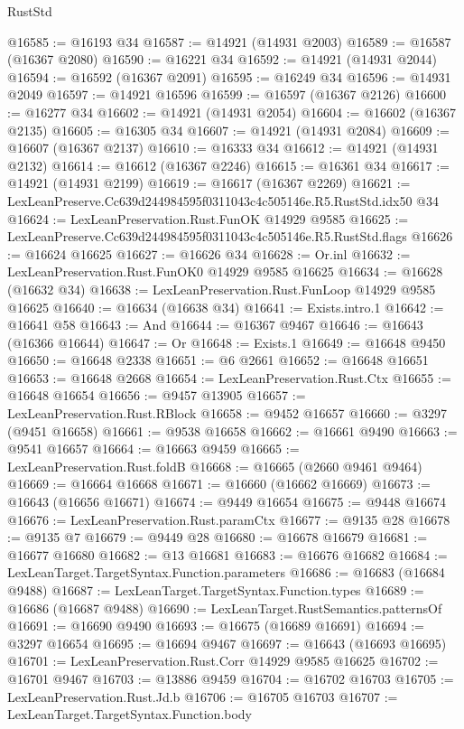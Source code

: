\begin{lexlean}{RustStd}
\begin{coremodule}
@16585 := @16193 @34
@16587 := @14921 (@14931 @2003)
@16589 := @16587 (@16367 @2080)
@16590 := @16221 @34
@16592 := @14921 (@14931 @2044)
@16594 := @16592 (@16367 @2091)
@16595 := @16249 @34
@16596 := @14931 @2049
@16597 := @14921 @16596
@16599 := @16597 (@16367 @2126)
@16600 := @16277 @34
@16602 := @14921 (@14931 @2054)
@16604 := @16602 (@16367 @2135)
@16605 := @16305 @34
@16607 := @14921 (@14931 @2084)
@16609 := @16607 (@16367 @2137)
@16610 := @16333 @34
@16612 := @14921 (@14931 @2132)
@16614 := @16612 (@16367 @2246)
@16615 := @16361 @34
@16617 := @14921 (@14931 @2199)
@16619 := @16617 (@16367 @2269)
@16621 := LexLeanPreserve.Cc639d244984595f0311043c4c505146e.R5.RustStd.idx50 @34
@16624 := LexLeanPreservation.Rust.FunOK @14929 @9585
@16625 := LexLeanPreserve.Cc639d244984595f0311043c4c505146e.R5.RustStd.flags
@16626 := @16624 @16625
@16627 := @16626 @34
@16628 := Or.inl
@16632 := LexLeanPreservation.Rust.FunOK0 @14929 @9585 @16625
@16634 := @16628 (@16632 @34)
@16638 := LexLeanPreservation.Rust.FunLoop @14929 @9585 @16625
@16640 := @16634 (@16638 @34)
@16641 := Exists.intro.{1}
@16642 := @16641 @58
@16643 := And
@16644 := @16367 @9467
@16646 := @16643 (@16366 @16644)
@16647 := Or
@16648 := Exists.{1}
@16649 := @16648 @9450
@16650 := @16648 @2338
@16651 := @6 @2661
@16652 := @16648 @16651
@16653 := @16648 @2668
@16654 := LexLeanPreservation.Rust.Ctx
@16655 := @16648 @16654
@16656 := @9457 @13905
@16657 := LexLeanPreservation.Rust.RBlock
@16658 := @9452 @16657
@16660 := @3297 (@9451 @16658)
@16661 := @9538 @16658
@16662 := @16661 @9490
@16663 := @9541 @16657
@16664 := @16663 @9459
@16665 := LexLeanPreservation.Rust.foldB
@16668 := @16665 (@2660 @9461 @9464)
@16669 := @16664 @16668
@16671 := @16660 (@16662 @16669)
@16673 := @16643 (@16656 @16671)
@16674 := @9449 @16654
@16675 := @9448 @16674
@16676 := LexLeanPreservation.Rust.paramCtx
@16677 := @9135 @28
@16678 := @9135 @7
@16679 := @9449 @28
@16680 := @16678 @16679
@16681 := @16677 @16680
@16682 := @13 @16681
@16683 := @16676 @16682
@16684 := LexLeanTarget.TargetSyntax.Function.parameters
@16686 := @16683 (@16684 @9488)
@16687 := LexLeanTarget.TargetSyntax.Function.types
@16689 := @16686 (@16687 @9488)
@16690 := LexLeanTarget.RustSemantics.patternsOf
@16691 := @16690 @9490
@16693 := @16675 (@16689 @16691)
@16694 := @3297 @16654
@16695 := @16694 @9467
@16697 := @16643 (@16693 @16695)
@16701 := LexLeanPreservation.Rust.Corr @14929 @9585 @16625
@16702 := @16701 @9467
@16703 := @13886 @9459
@16704 := @16702 @16703
@16705 := LexLeanPreservation.Rust.Jd.b
@16706 := @16705 @16703
@16707 := LexLeanTarget.TargetSyntax.Function.body

\end{coremodule}
\end{lexlean}
